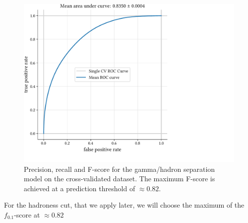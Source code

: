\begin{figure}
    \centering
    \includegraphics[page=3, width=.8\textwidth]{../analysis/plots/cross_val_sep_perf_plot.pdf}
    \caption{Precision, recall and F-score for the gamma/hadron separation model on the 
    cross-validated dataset. The maximum F-score is achieved at a prediction threshold
    of $\approx \num{0.82}$.}
    \label{fig:gh_fscore}
\end{figure}

For the hadroness cut, that we apply later, we will choose the maximum of the $f_{\num{0.1}}$-score
at $\approx \num{0.82}$